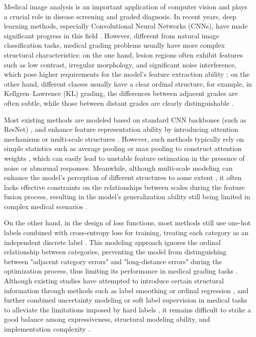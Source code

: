 \documentclass[runningheads]{llncs}
\begin{document}
Medical image analysis is an important application of computer vision and plays a crucial role in disease screening and graded diagnosis. In recent years, deep learning methods, especially Convolutional Neural Networks (CNNs), have made significant progress in this field \cite{1}. However, different from natural image classification tasks, medical grading problems usually have more complex structural characteristics: on the one hand, lesion regions often exhibit features such as low contrast, irregular morphology, and significant noise interference, which pose higher requirements for the model's feature extraction ability \cite{1,23,27}; on the other hand, different classes usually have a clear ordinal structure, for example, in Kellgren--Lawrence (KL) grading, the differences between adjacent grades are often subtle, while those between distant grades are clearly distinguishable \cite{2,3,10}.

Most existing methods are modeled based on standard CNN backbones (such as ResNet) \cite{4}, and enhance feature representation ability by introducing attention mechanisms or multi-scale structures \cite{5,6,7,8,13,14,15,16}. However, such methods typically rely on simple statistics such as average pooling or max pooling to construct attention weights \cite{5,6}, which can easily lead to unstable feature estimation in the presence of noise or abnormal responses. Meanwhile, although multi-scale modeling can enhance the model's perception of different structures to some extent \cite{7,8,13,14}, it often lacks effective constraints on the relationships between scales during the feature fusion process, resulting in the model's generalization ability still being limited in complex medical scenarios \cite{8,23}.

On the other hand, in the design of loss functions, most methods still use one-hot labels combined with cross-entropy loss for training, treating each category as an independent discrete label \cite{9,10}. This modeling approach ignores the ordinal relationship between categories, preventing the model from distinguishing between "adjacent category errors" and "long-distance errors" during the optimization process, thus limiting its performance in medical grading tasks \cite{3,9,10}. Although existing studies have attempted to introduce certain structural information through methods such as label smoothing or ordinal regression \cite{9,10,11}, and further combined uncertainty modeling or soft label supervision in medical tasks to alleviate the limitations imposed by hard labels \cite{22,25,26,27}, it remains difficult to strike a good balance among expressiveness, structural modeling ability, and implementation complexity \cite{10,23,25}.
\end{document}
